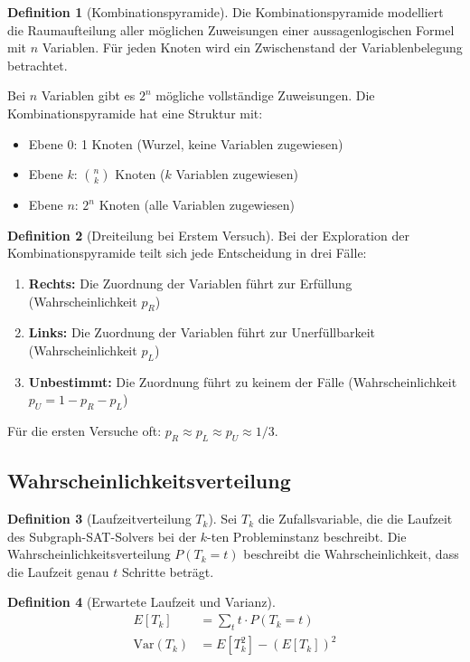 ﻿\documentclass[a4paper,12pt]{article}
\theoremstyle{definition}
\newtheorem{definition}{Definition}
\begin{document}
\begin{definition}[Kombinationspyramide]
Die Kombinationspyramide modelliert die Raumaufteilung aller möglichen Zuweisungen einer aussagenlogischen Formel mit $n$ Variablen. Für jeden Knoten wird ein Zwischenstand der Variablenbelegung betrachtet.

Bei $n$ Variablen gibt es $2^n$ mögliche vollständige Zuweisungen. Die Kombinationspyramide hat eine Struktur mit:
\begin{itemize}
	\item Ebene 0: 1 Knoten (Wurzel, keine Variablen zugewiesen)
	\item Ebene $k$: $\binom{n}{k}$ Knoten ($k$ Variablen zugewiesen)
	\item Ebene $n$: $2^n$ Knoten (alle Variablen zugewiesen)
\end{itemize}
\end{definition}

\begin{definition}[Dreiteilung bei Erstem Versuch]
Bei der Exploration der Kombinationspyramide teilt sich jede Entscheidung in drei Fälle:
\begin{enumerate}
	\item \textbf{Rechts:} Die Zuordnung der Variablen führt zur Erfüllung (Wahrscheinlichkeit $p_R$)
	\item \textbf{Links:} Die Zuordnung der Variablen führt zur Unerfüllbarkeit (Wahrscheinlichkeit $p_L$)
	\item \textbf{Unbestimmt:} Die Zuordnung führt zu keinem der Fälle (Wahrscheinlichkeit $p_U = 1 - p_R - p_L$)
\end{enumerate}

Für die ersten Versuche oft: $p_R \approx p_L \approx p_U \approx 1/3$.
\end{definition}

\subsection{Wahrscheinlichkeitsverteilung}

\begin{definition}[Laufzeitverteilung $T_k$]
Sei $T_k$ die Zufallsvariable, die die Laufzeit des Subgraph-SAT-Solvers bei der $k$-ten Probleminstanz beschreibt. Die Wahrscheinlichkeitsverteilung $P(T_k = t)$ beschreibt die Wahrscheinlichkeit, dass die Laufzeit genau $t$ Schritte beträgt.
\end{definition}

\begin{definition}[Erwartete Laufzeit und Varianz]
\begin{align}
	E[T_k] &= \sum_{t} t \cdot P(T_k = t) \\
	\text{Var}(T_k) &= E[T_k^2] - (E[T_k])^2
\end{align}
\end{definition}
\end{document}
